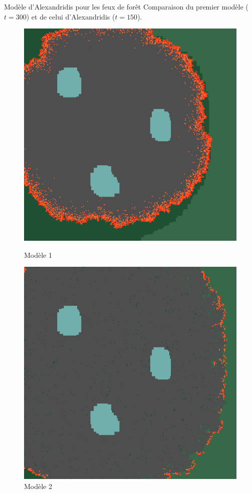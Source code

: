 \documentclass{beamer}
\begin{document}
\begin{frame}{Modèle d'Alexandridis pour les feux de forêt \hyperlink{jump}{\beamerbutton{ }} \hypertarget{11}{\beamerbutton{ }}}
    Comparaison du premier modèle ($t=300$) et de celui d'Alexandridis ($t=150$).
    
    \begin{figure}[!htb]
        \begin{minipage}{0.48\textwidth}
          \centering
          \includegraphics[width=.8\linewidth]{pictures/model1/land_300.png}
          \caption{Modèle 1}\label{Fig:Data1}
        \end{minipage}\hfill
        \begin{minipage}{0.48\textwidth}
          \centering
          \includegraphics[width=.8\linewidth]{pictures/model2/land_150_nowind.png}
          \caption{Modèle 2}\label{Fig:Data2}
        \end{minipage}
     \end{figure}
\end{frame}
\end{document}
